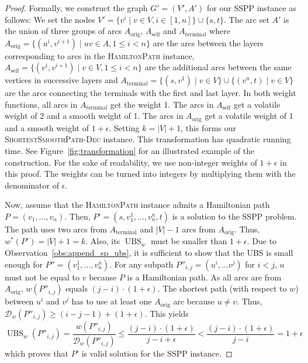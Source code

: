 \documentclass[a4paper,UKenglish,cleveref, autoref, thm-restate]{lipics-v2021}
\newcommand*{\dist}{\mathcal{D}}
\newcommand*{\ubs}{\operatorname{UBS}}
\begin{document}
\begin{proof}
Formally, we construct the graph $G'=(V',A')$ for our SSPP instance as follows:
We set the nodes $V' = \{ v^i \mid v \in V, i \in [1,n] \} \cup \{s,t\}$.
The arc set $A'$ is the union of three groups of arcs $A_{\operatorname{orig}}$, $A_{\operatorname{self}}$ and $A_{\operatorname{terminal}}$ where $A_{\operatorname{orig}} = \{ (u^i, v^{i+1}) \mid uv \in A, 1 \leq i < n \}$ are the arcs between the layers corresponding to arcs in the \textsc{HamiltonPath} instance, $A_{\operatorname{self}} = \{ (v^i, v^{i+1}) \mid v \in V, 1 \leq i < n \}$ are the additional arcs between the same vertices in successive layers and $A_{\operatorname{terminal}} = \{ (s, v^1) \mid v \in V \} \cup \{ (v^n, t) \mid v \in V \}$ are the arcs connecting the terminals with the first and last layer.
In both weight functions, all arcs in $A_{\operatorname{terminal}}$ get the weight 1.
The arcs in $A_{\operatorname{self}}$ get a volatile weight of 2 and a smooth weight of 1.
The arcs in $A_{\operatorname{orig}}$ get a volatile weight of 1 and a smooth weight of $1+\epsilon$.
Setting $k=|V|+1$, this forms our \textsc{ShortestSmoothPath-Dec} instance.
This transformation has quadratic running time.
See Figure~\ref{fig:transformation} for an illustrated example of the construction.
For the sake of readability, we use non-integer weights of $1+\epsilon$ in this proof.
The weights can be turned into integers by multiplying them with the denominator of $\epsilon$.

Now, assume that the \textsc{HamiltonPath} instance admits a Hamiltonian path $P = (v_1, \dots, v_n)$.
Then, $P' = (s, v_1^1, \dots, v_n^n, t)$ is a solution to the SSPP problem.
The path uses two arcs from $A_{\operatorname{terminal}}$ and $|V|-1$ arcs from $A_{\operatorname{orig}}$.
Thus, $w^{*}(P') = |V| + 1 = k$.
Also, its $\ubs_w$ must be smaller than $1+\epsilon$.
Due to Observation~\ref{obs:append_sp_ubs}, it is sufficient to show that the UBS is small enough for $P'' = (v_1^1, \dots, v_n^n)$.
For any subpath $P''_{i,j} = (u^i, \dots v^j)$ for $i < j$, $u$ must not be equal to $v$ because $P$ is a Hamiltonian path.
As all arcs are from $A_{\operatorname{orig}}$, $w(P''_{i,j})$ equals $(j-i) \cdot (1+\epsilon)$.
The shortest path (with respect to $w$) between $u^i$ and $v^j$ has to use at least one $A_{\operatorname{orig}}$ arc because $u \neq v$.
Thus, $\dist_w(P''_{i,j}) \geq (i - j - 1) + (1 + \epsilon)$.
This yields
\[
\ubs_w(P''_{i,j}) = \frac{w(P''_{i,j})}{\dist_w(P''_{i,j})} \leq \frac{(j-i) \cdot (1+\epsilon)}{j-i+\epsilon} < \frac{(j-i) \cdot (1+\epsilon)}{j-i} = 1 + \epsilon
\]
which proves that $P'$ is valid solution for the SSPP instance.


\end{proof}
\end{document}
